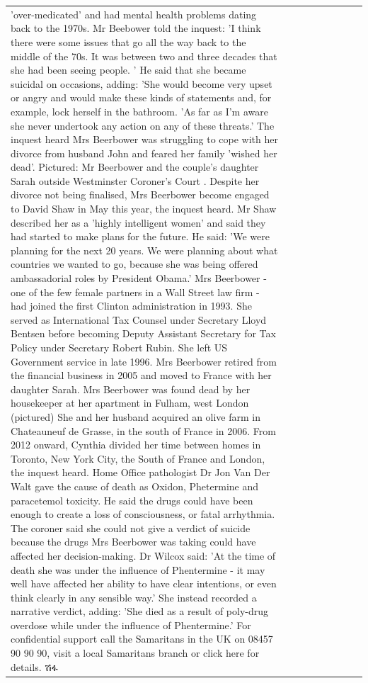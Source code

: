 \begin{table}[H]
\begin{tabular}{lllrlllll}
'over-medicated' and had mental health problems dating back to the 1970s. Mr Beebower told the inquest: 'I think there were some issues that go all the way back to the middle of the 70s. It was between two and three decades that she had been seeing people. ' He said that she became suicidal on occasions, adding: 'She would become very upset or angry and would make these kinds of statements and, for example, lock herself in the bathroom. 'As far as I'm aware she never undertook any action on any of these threats.' The inquest heard Mrs Beerbower was struggling to cope with her divorce from husband John and feared her family 'wished her dead'. Pictured: Mr Beerbower and the couple's daughter Sarah outside Westminster Coroner's Court . Despite her divorce not being finalised, Mrs Beerbower become engaged to David Shaw in May this year, the inquest heard. Mr Shaw described her as a 'highly intelligent women' and said they had started to make plans for the future. He said: 'We were planning for the next 20 years. We were planning about what countries we wanted to go, because she was being offered ambassadorial roles by President Obama.' Mrs Beerbower - one of the few female partners in a Wall Street law firm - had joined the first Clinton administration in 1993. She served as International Tax Counsel under Secretary Lloyd Bentsen before becoming Deputy Assistant Secretary for Tax Policy under Secretary Robert Rubin. She left US Government service in late 1996. Mrs Beerbower retired from the financial business in 2005 and moved to France with her daughter Sarah. Mrs Beerbower was found dead by her housekeeper at her apartment in Fulham, west London (pictured) She and her husband acquired an olive farm in Chateauneuf de Grasse, in the south of France in 2006. From 2012 onward, Cynthia divided her time between homes in Toronto, New York City, the South of France and London, the inquest heard. Home Office pathologist Dr Jon Van Der Walt gave the cause of death as Oxidon, Phetermine and paracetemol toxicity. He said the drugs could have been enough to create a loss of consciousness, or fatal arrhythmia. The coroner said she could not give a verdict of suicide because the drugs Mrs Beerbower was taking could have affected her decision-making. Dr Wilcox said: 'At the time of death she was under the influence of Phentermine - it may well have affected her ability to have clear intentions, or even think clearly in any sensible way.' She instead recorded a narrative verdict, adding: 'She died as a result of poly-drug overdose while under the influence of Phentermine.' For confidential support call the Samaritans in the UK on 08457 90 90 90, visit a local Samaritans branch or click here for details. ሽፋ \\

\end{tabular}
\end{table}
